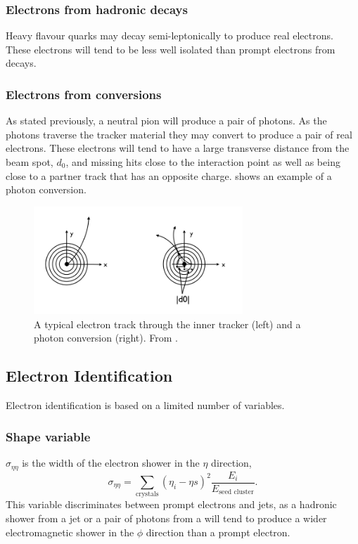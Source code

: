 \subsubsection{Electrons from hadronic decays}
Heavy flavour quarks may decay semi-leptonically to produce real electrons. These
electrons will tend to be less well isolated than prompt electrons from \PW
decays.

\subsubsection{Electrons from conversions}
As stated previously, a neutral pion will produce a pair of photons. As the
photons traverse the tracker material they may convert to produce a pair of real
electrons. These electrons will tend to have a large transverse distance from
the beam spot, $d_0$, and  missing hits close to the interaction point as well as
being close to a partner track that has an opposite charge.
 shows an example of a photon conversion.

\begin{figure}[htb]
  \centering
  \includegraphics[width=0.7\textwidth]{conversion}
  \caption{A typical electron track through the inner tracker (left) and a
photon conversion (right). From \cite{eConver}.}
  \label{fig:conversion}
\end{figure}

\subsection{Electron Identification}
Electron identification is based on a limited number of variables.

\subsubsection{Shape variable}

$\sigma_{\eta\eta}$ is the width of the electron shower in the $\eta$
direction,
\begin{equation}
\sigma_{\eta\eta} = 
\sum_{\text{crystals}} \left(\eta_{i} - \eta{s}\right)^{2}
\frac{E_{i}}{E_{\text{seed cluster}}}.
\end{equation}
This variable discriminates between prompt electrons and jets, as a hadronic
shower from a jet or a pair of photons from a \Ppizero will tend to produce a
wider electromagnetic shower in the $\phi$ direction than a prompt electron.


